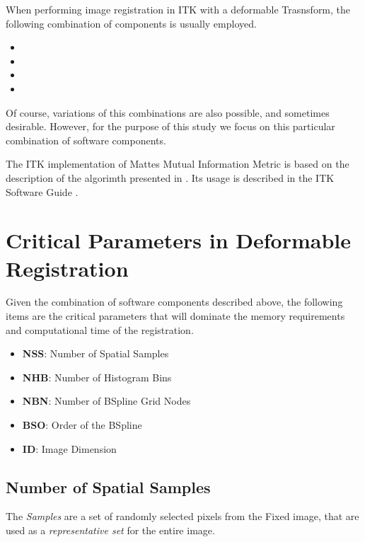 \documentclass{InsightArticle}
\begin{document}
When performing image registration in ITK with a deformable Trasnsform, the
following combination of components is usually employed.

\begin{itemize}
\item {}
\item {}
\item {}
\item {}
\end{itemize}

Of course, variations of this combinations are also possible, and sometimes
desirable. However, for the purpose of this study we focus on this particular
combination of software components.

The ITK implementation of Mattes Mutual Information Metric is based on the
description of the algorimth presented in \cite{Mattes2001,Mattes2003}. Its
usage is described in the ITK Software Guide
\cite{ITKSoftwareGuideSecondEdition}.


\section{Critical Parameters in Deformable Registration}
\label{sec:CriticalParameters}

Given the combination of software components described above, the following
items are the critical parameters that will dominate the memory requirements
and computational time of the registration.

\begin{itemize}
\item \textbf{NSS}: Number of Spatial Samples
\item \textbf{NHB}: Number of Histogram Bins
\item \textbf{NBN}: Number of BSpline Grid Nodes
\item \textbf{BSO}: Order of the BSpline
\item \textbf{ID}:  Image Dimension
\end{itemize}

\subsection{Number of Spatial Samples}

The \emph{Samples} are a set of randomly selected pixels from the Fixed image,
that are used as a \emph{representative set} for the entire image.
\end{document}
